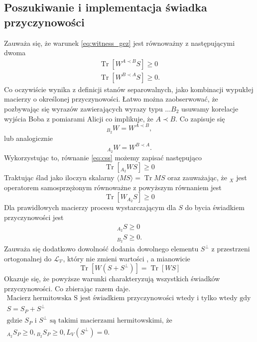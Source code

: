 \documentclass[10pt]{article} %
\DeclareMathOperator{\Trs}{Tr}
\begin{document}
\subsection{Poszukiwanie i implementacja świadka przyczynowości}
Zauważa się, że warunek \eqref{eq:witness_gez} jest równoważny z następującymi dwoma
\begin{gather}
\label{eq:css2}
\Trs \left[ W^{A \prec B} S\right] \geq 0 \\
\label{eq:css}
\Trs \left[ W^{B \prec A} S\right] \geq 0.
\end{gather}
Co oczywiście wynika z definicji stanów separowalnych, jako kombinacji wypukłej macierzy o określonej przyczynowości.
Łatwo można zaobserwować, że pozbywając się wyrazów zawierających wyrazy typu $\dots B_2$ usuwamy korelacje wyjścia Boba z pomiarami Alicji co
implikuje, że $A \prec B$. Co zapisuje się
\begin{equation}
{}_{B_2} W = W^{A \prec B},
\end{equation}
lub analogicznie
\begin{equation}
{}_{A_2} W = W^{B \prec A}.
\end{equation}
Wykorzystując to, równanie \eqref{eq:css} możemy zapisać następująco
\begin{equation}
\Trs \left[ {}_{A_2} W S\right] \geq 0
\end{equation}
Traktując ślad jako iloczyn skalarny $\langle M S \rangle = \Trs MS$ oraz zauważając, że ${}_X$ jest operatorem samosprzężonym równoważne z powyższym
równaniem jest
\begin{equation}
\Trs \left[ W {}_{A_2}S \right] \geq 0
\end{equation}
Dla prawidłowych macierzy procesu wystarczającym dla $S$ do bycia świadkiem przyczynowości jest 
\begin{gather}
{}_{A_2} S \geq 0 \\
{}_{B_2} S \geq 0.
\end{gather}
Zauważa się dodatkowo dowolność dodania dowolnego elementu $S^\bot$ z przestrzeni ortogonalnej do $\mathcal{L_V}$, który nie zmieni wartości \label{eq:witness_gez}, a mianowicie
\begin{equation}
\Trs\left[W\left(S + S^\bot\right)\right] = \Trs\left[WS\right]
\end{equation}
Okazuje się, że powyższe warunki charakteryzują wszystkich świadków przyczynowości.
Co zbierając razem daje.
\begin{gather}
\text{Macierz hermitowska S jest świadkiem przyczynowości wtedy i tylko wtedy gdy da się ją zapisać, jako} \\
S = S_P + S^\bot \\
\text{gdzie $S_P$ i $S^\bot$ są takimi macierzami hermitowskimi, że} \\ 
{}_{A_2} S_P \geq 0, {}_{B_2} S_P \geq 0, L_V(S^\bot) = 0.
\end{gather}
\end{document}
